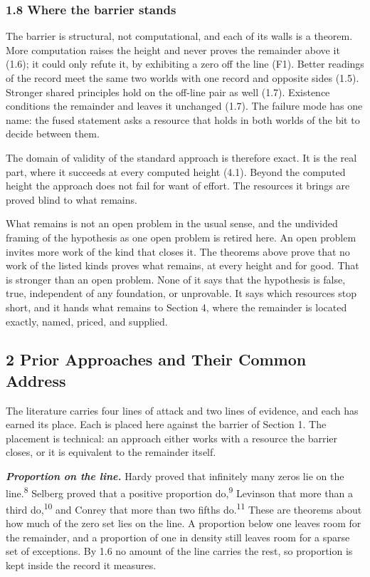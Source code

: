 \documentclass[10pt]{article}
\begin{document}
\hypertarget{where-the-barrier-stands}{%
\subsubsection{1.8 Where the barrier
stands}\label{where-the-barrier-stands}}

The barrier is structural, not computational, and each of its walls is a
theorem. More computation raises the height and never proves the
remainder above it (1.6); it could only refute it, by exhibiting a zero
off the line (F1). Better readings of the record meet the same two
worlds with one record and opposite sides (1.5). Stronger shared
principles hold on the off-line pair as well (1.7). Existence conditions
the remainder and leaves it unchanged (1.7). The failure mode has one
name: the fused statement asks a resource that holds in both worlds of
the bit to decide between them.

The domain of validity of the standard approach is therefore exact. It
is the real part, where it succeeds at every computed height (4.1).
Beyond the computed height the approach does not fail for want of
effort. The resources it brings are proved blind to what remains.

What remains is not an open problem in the usual sense, and the
undivided framing of the hypothesis as one open problem is retired here.
An open problem invites more work of the kind that closes it. The
theorems above prove that no work of the listed kinds proves what
remains, at every height and for good. That is stronger than an open
problem. None of it says that the hypothesis is false, true, independent
of any foundation, or unprovable. It says which resources stop short,
and it hands what remains to Section 4, where the remainder is located
exactly, named, priced, and supplied.

\hypertarget{prior-approaches-and-their-common-address}{%
\subsection{2 Prior Approaches and Their Common
Address}\label{prior-approaches-and-their-common-address}}

The literature carries four lines of attack and two lines of evidence,
and each has earned its place. Each is placed here against the barrier
of Section 1. The placement is technical: an approach either works with
a resource the barrier closes, or it is equivalent to the remainder
itself.

\textbf{\emph{Proportion on the line.}} Hardy proved that infinitely
many zeros lie on the line.\textsuperscript{8} Selberg proved that a
positive proportion do,\textsuperscript{9} Levinson that more than a
third do,\textsuperscript{10} and Conrey that more than two fifths
do.\textsuperscript{11} These are theorems about how much of the zero
set lies on the line. A proportion below one leaves room for the
remainder, and a proportion of one in density still leaves room for a
sparse set of exceptions. By 1.6 no amount of the line carries the rest,
so proportion is kept inside the record it measures.
\end{document}
